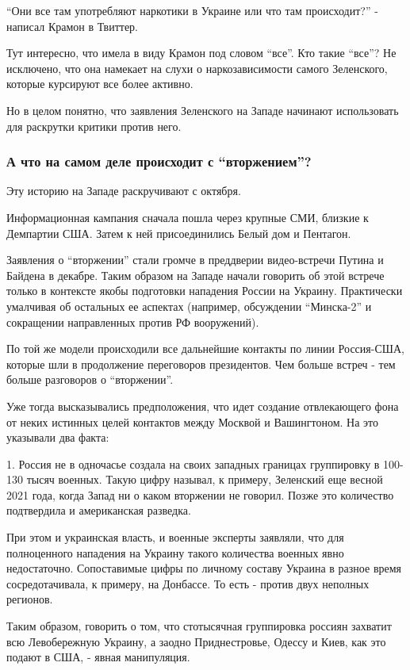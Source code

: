 \enquote{Они все там употребляют наркотики в Украине или что там происходит?} - написал
Крамон в Твиттер.

Тут интересно, что имела в виду Крамон под словом \enquote{все}. Кто такие \enquote{все}? Не
исключено, что она намекает на слухи о наркозависимости самого Зеленского,
которые курсируют все более активно.

Но в целом понятно, что заявления Зеленского на Западе начинают использовать
для раскрутки критики против него.

\subsubsection{А что на самом деле происходит с \enquote{вторжением}?}

Эту историю на Западе раскручивают с октября.

Информационная кампания сначала пошла через крупные СМИ, близкие к Демпартии
США. Затем к ней присоединились Белый дом и Пентагон. 

Заявления о \enquote{вторжении} стали громче в преддверии видео-встречи Путина и
Байдена в декабре. Таким образом на Западе начали говорить об этой встрече
только в контексте якобы подготовки нападения России на Украину. Практически
умалчивая об остальных ее аспектах (например, обсуждении \enquote{Минска-2} и
сокращении направленных против РФ вооружений).

По той же модели происходили все дальнейшие контакты по линии Россия-США,
которые шли в продолжение переговоров президентов. Чем больше встреч - тем
больше разговоров о \enquote{вторжении}.

Уже тогда высказывались предположения, что идет создание отвлекающего фона от
неких истинных целей контактов между Москвой и Вашингтоном. На это указывали
два факта:

1. Россия не в одночасье создала на своих западных границах группировку в
100-130 тысяч военных. Такую цифру называл, к примеру, Зеленский еще весной
2021 года, когда Запад ни о каком вторжении не говорил. Позже это количество
подтвердила и американская разведка. 

При этом и украинская власть, и военные эксперты заявляли, что для полноценного
нападения на Украину такого количества военных явно недостаточно. Сопоставимые
цифры по личному составу Украина в разное время сосредотачивала, к примеру, на
Донбассе. То есть - против двух неполных регионов.

Таким образом, говорить о том, что стотысячная группировка россиян захватит всю
Левобережную Украину, а заодно Приднестровье, Одессу и Киев, как это подают в
США, - явная манипуляция.

